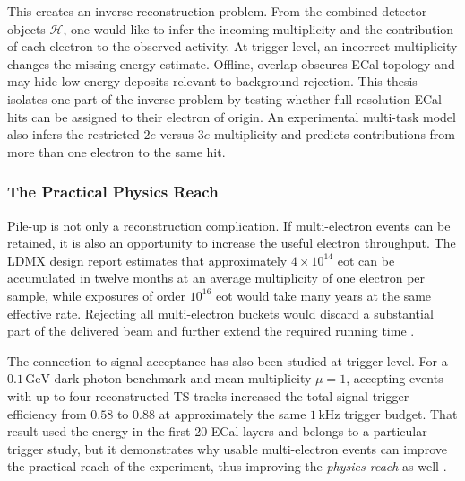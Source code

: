 This creates an inverse reconstruction problem. From the combined detector
objects \(\mathcal{H}\), one would like to infer the incoming multiplicity and
the contribution of each electron to the observed activity. At trigger level,
an incorrect multiplicity changes the missing-energy estimate. Offline,
overlap obscures ECal topology and may hide low-energy deposits relevant to
background rejection. This thesis isolates one part of the inverse problem by
testing whether full-resolution ECal hits can be assigned to their electron
of origin. An experimental multi-task model also infers the restricted
\(2e\)-versus-\(3e\) multiplicity and predicts contributions from more than
one electron to the same hit.




\subsubsection{The Practical Physics Reach}
\label{sec:practical_physics_reach}

Pile-up is not only a reconstruction complication. If multi-electron events
can be retained, it is also an opportunity to increase the useful electron
throughput. The LDMX design report
estimates that approximately \(4\times10^{14}\) \gls{eot} can be accumulated
in twelve months at an average multiplicity of one electron per sample, while
exposures of order \(10^{16}\) \gls{eot} would take many years at the same
effective rate. Rejecting all multi-electron buckets would discard a
substantial part of the delivered beam and further extend the required
running time \cite{ldmx2025-overview}.

The connection to signal acceptance has also been studied at trigger level.
For a \(0.1\,\mathrm{GeV}\) dark-photon benchmark and mean multiplicity
\(\mu=1\), accepting events with up to four reconstructed TS tracks increased
the total signal-trigger efficiency from \(0.58\) to \(0.88\) at
approximately the same \(1\,\mathrm{kHz}\) trigger budget. That result used
the energy in the first 20 ECal layers and belongs to a particular trigger
study, but it demonstrates why usable multi-electron events can improve the
practical reach of the experiment, thus improving the \textit{physics reach} as well \cite{ldmx2025-overview}.

